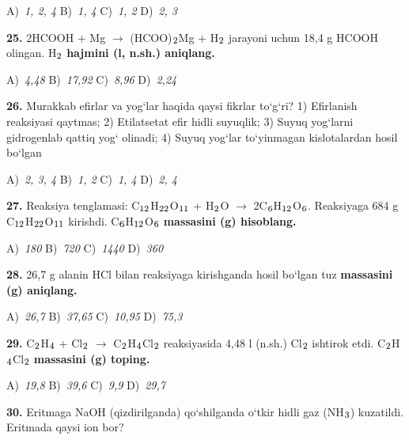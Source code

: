 \documentclass[11pt,a4paper]{article}
\renewcommand{\textsubscript}[1]{\ensuremath{_{\text{\fontsize{8}{8}\selectfont #1}}}}
\begin{document}
\begin{multicols}{2}
\noindent A)~\textsl{1, 2, 4} \hfill B)~\textsl{1, 4} \hfill C)~\textsl{1, 2} \hfill D)~\textsl{2, 3}\par
\vspace{4pt}
\noindent\textbf{25.} 2HCOOH + Mg $\to$ (HCOO)\textsubscript{2}Mg + H\textsubscript{2} jarayoni uchun 18,4 g HCOOH olingan. H\textsubscript{2} \textbf{hajmini (l, n.sh.) aniqlang.}

\noindent A)~\textsl{4,48} \hfill B)~\textsl{17,92} \hfill C)~\textsl{8,96} \hfill D)~\textsl{2,24}\par
\vspace{4pt}
\noindent\textbf{26.} Murakkab efirlar va yog`lar haqida qaysi fikrlar to`g`ri? 1) Efirlanish reaksiyasi qaytmas; 2) Etilatsetat efir hidli suyuqlik; 3) Suyuq yog`larni gidrogenlab qattiq yog` olinadi; 4) Suyuq yog`lar to`yinmagan kislotalardan hosil bo`lgan

\noindent A)~\textsl{2, 3, 4} \hfill B)~\textsl{1, 2} \hfill C)~\textsl{1, 4} \hfill D)~\textsl{2, 4}\par
\vspace{4pt}
\noindent\textbf{27.} Reaksiya tenglamasi: C\textsubscript{12}H\textsubscript{22}O\textsubscript{11} + H\textsubscript{2}O $\to$ 2C\textsubscript{6}H\textsubscript{12}O\textsubscript{6}. Reaksiyaga 684 g C\textsubscript{12}H\textsubscript{22}O\textsubscript{11} kirishdi. C\textsubscript{6}H\textsubscript{12}O\textsubscript{6} \textbf{massasini (g) hisoblang.}

\noindent A)~\textsl{180} \hfill B)~\textsl{720} \hfill C)~\textsl{1440} \hfill D)~\textsl{360}\par
\vspace{4pt}
\noindent\textbf{28.} 26,7 g alanin HCl bilan reaksiyaga kirishganda hosil bo`lgan tuz \textbf{massasini (g) aniqlang.}

\noindent A)~\textsl{26,7} \hfill B)~\textsl{37,65} \hfill C)~\textsl{10,95} \hfill D)~\textsl{75,3}\par
\vspace{4pt}
\noindent\textbf{29.} C\textsubscript{2}H\textsubscript{4} + Cl\textsubscript{2} $\to$ C\textsubscript{2}H\textsubscript{4}Cl\textsubscript{2} reaksiyasida 4,48 l (n.sh.) Cl\textsubscript{2} ishtirok etdi. C\textsubscript{2}H\textsubscript{4}Cl\textsubscript{2} \textbf{massasini (g) toping.}

\noindent A)~\textsl{19,8} \hfill B)~\textsl{39,6} \hfill C)~\textsl{9,9} \hfill D)~\textsl{29,7}\par
\vspace{4pt}
\noindent\textbf{30.} Eritmaga NaOH (qizdirilganda) qo`shilganda o`tkir hidli gaz (NH\textsubscript{3}) kuzatildi. Eritmada qaysi ion bor?


\end{multicols}
\end{document}
